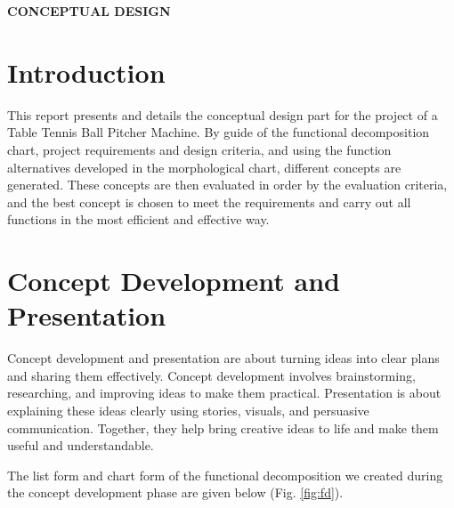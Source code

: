 \documentclass[12pt]{article}
\begin{document}
\begin{center}
    \vspace{1em} %
    \textbf{\LARGE CONCEPTUAL DESIGN}\\
    \vspace{1em} %
\end{center}

\section{Introduction}

This report presents and details the conceptual design part for the project of a Table Tennis Ball Pitcher Machine. By guide of the functional decomposition chart, project requirements and design criteria, and using the function alternatives developed in the morphological chart, different concepts are generated. These concepts are then evaluated in order by the evaluation criteria, and the best concept is chosen to meet the requirements and carry out all functions in the most efficient and effective way.

\section{Concept Development and Presentation}

Concept development and presentation are about turning ideas into clear plans and sharing them effectively. Concept development involves brainstorming, researching, and improving ideas to make them practical. Presentation is about explaining these ideas clearly using stories, visuals, and persuasive communication. Together, they help bring creative ideas to life and make them useful and understandable.

The list form and chart form of the functional decomposition we created during the concept development phase are given below (Fig. \ref{fig:fd}).
\end{document}
